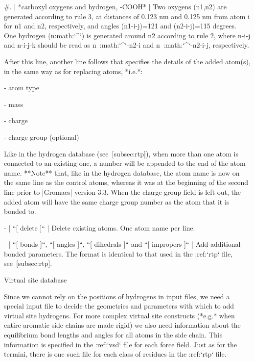    #. | *carboxyl oxygens and hydrogen, -COOH*
      | Two oxygens (n1,n2) are generated according to rule 3, at
        distances of 0.123 nm and 0.125 nm from atom i for n1 and n2,
        respectively, and angles (n1-i-j)=121 and (n2-i-j)=115 degrees.
        One hydrogen (n:math:`^\prime`) is generated around n2 according
        to rule 2, where n-i-j and n-i-j-k should be read as
        n\ :math:`^\prime`-n2-i and n\ :math:`^\prime`-n2-i-j,
        respectively.

   After this line, another line follows that specifies the details of
   the added atom(s), in the same way as for replacing atoms, *i.e.*:

   -  atom type

   -  mass

   -  charge

   -  charge group (optional)

   Like in the hydrogen database (see [subsec:rtp]), when more than one
   atom is connected to an existing one, a number will be appended to
   the end of the atom name. **Note** that, like in the hydrogen
   database, the atom name is now on the same line as the control atoms,
   whereas it was at the beginning of the second line prior to |Gromacs|
   version 3.3. When the charge group field is left out, the added atom
   will have the same charge group number as the atom that it is bonded
   to.

-  | ``[ delete ]``
   | Delete existing atoms. One atom name per line.

-  | ``[ bonds ]``, ``[ angles ]``,
     ``[ dihedrals ]`` and ``[ impropers ]``
   | Add additional bonded parameters. The format is identical to that
     used in the :ref:`rtp` file, see [subsec:rtp].

Virtual site database
~~~~~~~~~~~~~~~~~~~~~

Since we cannot rely on the positions of hydrogens in input files, we
need a special input file to decide the geometries and parameters with
which to add virtual site hydrogens. For more complex virtual site
constructs (*e.g.* when entire aromatic side chains are made rigid) we
also need information about the equilibrium bond lengths and angles for
all atoms in the side chain. This information is specified in the
:ref:`vsd` file for each force field. Just as for the termini,
there is one such file for each class of residues in the
:ref:`rtp` file.

